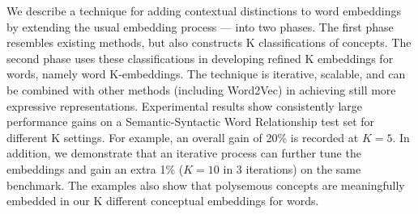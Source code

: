 We describe a technique for adding contextual distinctions to word 
embeddings by extending the usual embedding process --- into two phases.  
The first phase resembles existing methods, but also constructs K 
classifications of concepts.  The second phase uses these classifications 
in developing refined K embeddings for words, namely word K-embeddings.  
The technique is iterative, scalable, and can be combined with other 
methods (including Word2Vec) in achieving still more expressive 
representations. Experimental results show consistently large 
performance gains on a Semantic-Syntactic Word Relationship test set for 
different K settings. For example, an overall gain of 20\% is recorded at 
$K=5$. In addition, we demonstrate that an iterative process can further 
tune the embeddings and gain an extra 1\% ($K=10$ in 3 iterations) on the 
same benchmark. The examples also show that polysemous concepts are 
meaningfully embedded in our K different conceptual embeddings for words.
